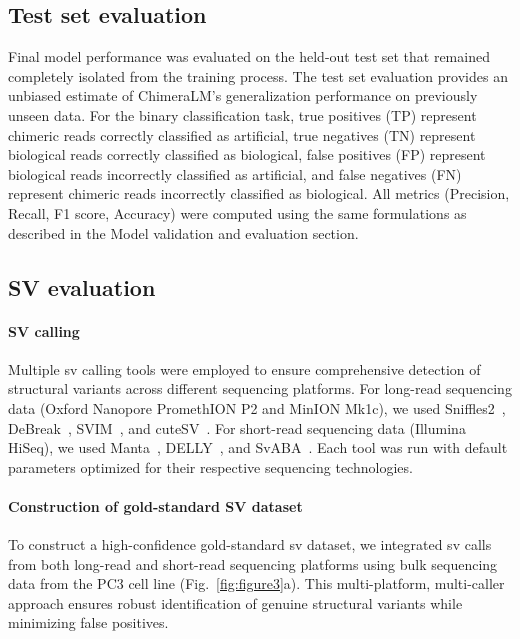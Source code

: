 \documentclass[pdflatex,sn-nature]{sn-jnl}%
\theoremstyle{thmstyleone}%
\theoremstyle{thmstyletwo}%
\theoremstyle{thmstylethree}%
\begin{document}
\subsection*{Test set evaluation}

Final model performance was evaluated on the held-out test set that remained completely isolated from the training process.
The test set evaluation provides an unbiased estimate of ChimeraLM's generalization performance on previously unseen data.
For the binary classification task, true positives (TP) represent chimeric reads correctly classified as artificial, true negatives (TN) represent biological reads correctly classified as biological, false positives (FP) represent biological reads incorrectly classified as artificial, and false negatives (FN) represent chimeric reads incorrectly classified as biological.
All metrics (Precision, Recall, F1 score, Accuracy) were computed using the same formulations as described in the Model validation and evaluation section.

\subsection*{SV evaluation}

\paragraph{SV calling}
Multiple \gls{sv} calling tools were employed to ensure comprehensive detection of structural variants across different sequencing platforms.
For long-read sequencing data (Oxford Nanopore PromethION P2 and MinION Mk1c), we used Sniffles2~\cite{Sedlazeck2018, Smolka2024}, DeBreak~\cite{chen2023deciphering}, SVIM~\cite{heller2019svim}, and cuteSV~\cite{jiang2020longreadbased}.
For short-read sequencing data (Illumina HiSeq), we used Manta~\cite{chen2016manta}, DELLY~\cite{rausch2012delly}, and SvABA~\cite{wala2018svaba}.
Each tool was run with default parameters optimized for their respective sequencing technologies.

\paragraph{Construction of gold-standard SV dataset}
To construct a high-confidence gold-standard \gls{sv} dataset, we integrated \gls{sv} calls from both long-read and short-read sequencing platforms using bulk sequencing data from the PC3 cell line (Fig.~\ref{fig:figure3}a).
This multi-platform, multi-caller approach ensures robust identification of genuine structural variants while minimizing false positives.
\end{document}

